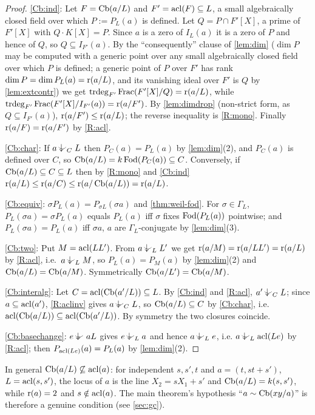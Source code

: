 \begin{proof}
\ref{Cb:ind}: Let $F=\operatorname{Cb}(a/L)$ and $F'=\operatorname{acl}(F)\subseteq L$, a small algebraically
closed field over which $P:=P_L(a)$ is defined.  Let $Q=P\cap F'[X]$, a prime of
$F'[X]$ with $Q\cdot K[X]=P$.  Since $a$ is a zero of $I_L(a)$ it is a zero of $P$ and
hence of $Q$, so $Q\subseteq I_{F'}(a)$.  By the ``consequently'' clause of \cref{lem:dim} ($\dim P$ may be computed with a
generic point over any small algebraically closed field over which $P$ is defined; a
generic point of $P$ over $F'$ has rank $\dim P=\dim P_L(a)=\operatorname{r}(a/L)$, and its
vanishing ideal over $F'$ is $Q$ by \cref{lem:extcontr}) we get
$\operatorname{trdeg}_{F'}\operatorname{Frac}(F'[X]/Q)=\operatorname{r}(a/L)$, while
$\operatorname{trdeg}_{F'}\operatorname{Frac}(F'[X]/I_{F'}(a))=\operatorname{r}(a/F')$.  By \cref{lem:dimdrop}
(non-strict form, as $Q\subseteq I_{F'}(a)$), $\operatorname{r}(a/F')\le\operatorname{r}(a/L)$; the
reverse inequality is \ref{R:mono}.  Finally $\operatorname{r}(a/F)=\operatorname{r}(a/F')$ by \ref{R:acl}.

\ref{Cb:char}: If $a\ind{C}L$ then $P_C(a)=P_L(a)$ by \cref{lem:dim}(2), and $P_C(a)$
is defined over $C$, so $\operatorname{Cb}(a/L)=k\operatorname{Fod}(P_C(a))\subseteq C$.  Conversely, if
$\operatorname{Cb}(a/L)\subseteq C\subseteq L$ then by \ref{R:mono} and \ref{Cb:ind}
$\operatorname{r}(a/L)\le\operatorname{r}(a/C)\le\operatorname{r}(a/\operatorname{Cb}(a/L))=\operatorname{r}(a/L)$.

\ref{Cb:equiv}: $\sigma P_L(a)=P_{\sigma L}(\sigma a)$ and \cref{thm:weil-fod}.  For
$\sigma\in\Gamma_L$, $P_L(\sigma a)=\sigma P_L(a)$ equals $P_L(a)$ iff $\sigma$ fixes
$\operatorname{Fod}(P_L(a))$ pointwise; and $P_L(\sigma a)=P_L(a)$ iff $\sigma a$, $a$ are
$\Gamma_L$-conjugate by \cref{lem:dim}(3).

\ref{Cb:two}: Put $M=\operatorname{acl}(LL')$.  From $a\ind{L}L'$ we get $\operatorname{r}(a/M)=\operatorname{r}(a/LL')=\operatorname{r}(a/L)$
by \ref{R:acl}, i.e.\ $a\ind{L}M$, so $P_L(a)=P_M(a)$ by \cref{lem:dim}(2) and
$\operatorname{Cb}(a/L)=\operatorname{Cb}(a/M)$.  Symmetrically $\operatorname{Cb}(a/L')=\operatorname{Cb}(a/M)$.

\ref{Cb:interalg}: Let $C=\operatorname{acl}(\operatorname{Cb}(a'/L))\subseteq L$.  By \ref{Cb:ind} and \ref{R:acl},
$a'\ind{C}L$; since $a\subseteq\operatorname{acl}(a')$, \ref{R:aclinv} gives $a\ind{C}L$, so
$\operatorname{Cb}(a/L)\subseteq C$ by \ref{Cb:char}, i.e.\ $\operatorname{acl}(\operatorname{Cb}(a/L))\subseteq\operatorname{acl}(\operatorname{Cb}(a'/L))$.
By symmetry the two closures coincide.

\ref{Cb:basechange}: $e\ind{}aL$ gives $e\ind{L}a$ and hence $a\ind{L}e$, i.e.
$a\ind{L}\acl(Le)$ by \ref{R:acl}; then $P_{\operatorname{acl}(Le)}(a)=P_L(a)$ by \cref{lem:dim}(2).
\end{proof}

\begin{remark}\label{rem:cb-not-acl}
In general $\operatorname{Cb}(a/L)\not\subseteq\operatorname{acl}(a)$: for independent $s,s',t$ and
$a=(t,st+s')$, $L=\operatorname{acl}(s,s')$, the locus of $a$ is the line $X_2=sX_1+s'$ and
$\operatorname{Cb}(a/L)=k(s,s')$, while $\operatorname{r}(a)=2$ and $s\notin\operatorname{acl}(a)$.  The main theorem's
hypothesis ``$a\sim\operatorname{Cb}(xy/a)$'' is therefore a genuine condition (see
\cref{sec:gc}).
\end{remark}

